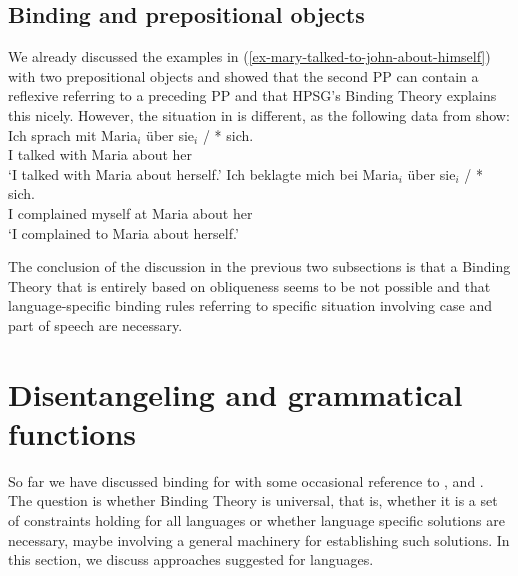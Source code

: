 \documentclass[output=paper
	        ,collection
	        ,collectionchapter
 	        ,biblatex
                ,babelshorthands
                ,newtxmath
                ,draftmode
                ,colorlinks, citecolor=brown
]{langscibook}
\begin{document}
{%





\subsection{Binding and prepositional objects}


We already discussed the  examples in (\ref{ex-mary-talked-to-john-about-himself}) with two
prepositional objects and showed that the second PP can contain a reflexive referring to a preceding
PP and that HPSG's Binding Theory explains this nicely. However, the situation in  is
different, as the following data from \citet[]{Grewendorf88a} show:
\eal
\ex 
\gll Ich sprach mit  Maria$_i$ über  sie$_i$ / * sich.\\
     I talked   with Maria     about her    {} {} \self\\
\glt `I talked with Maria about herself.'
\ex 
\gll Ich beklagte mich   bei Maria$_i$ über  sie$_i$ / * sich.\\
     I complained myself at  Maria     about her    {} {} \self\\
\glt `I complained to Maria about herself.'
\zl


The conclusion of the discussion in the previous two subsections is that a Binding Theory that is entirely based on
obliqueness seems to be not possible and that language-specific binding rules referring to specific
situation involving case and part of speech are necessary.
}%

\section{Disentangeling \argst and grammatical functions}

So far we have discussed binding for  with some occasional reference to  ,
 and . The question is whether Binding Theory is universal, that is, whether it is a
set of constraints holding for all languages or whether language specific solutions are necessary,
maybe involving a general machinery for establishing such solutions. In this section, we discuss
approaches suggested for  languages.
\end{document}
